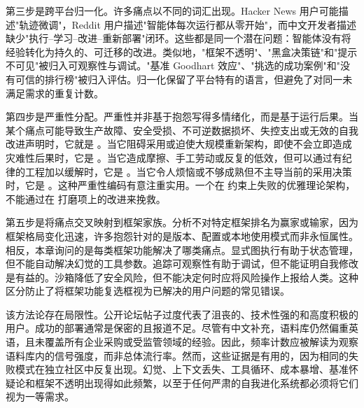 第三步是跨平台归一化。许多痛点以不同的词汇出现。Hacker News 用户可能描述"轨迹微调"，Reddit 用户描述"智能体每次运行都从零开始"，而中文开发者描述缺少"执行--学习--改进--重新部署"闭环。这些都是同一个潜在问题：智能体没有将经验转化为持久的、可迁移的改进。类似地，"框架不透明"、"黑盒决策链"和"提示不可见"被归入可观察性与调试。"基准 Goodhart 效应"、"挑选的成功案例"和"没有可信的排行榜"被归入评估。归一化保留了平台特有的语言，但避免了对同一未满足需求的重复计数。

第四步是严重性分配。严重性并非基于抱怨写得多情绪化，而是基于运行后果。当某个痛点可能导致生产故障、安全受损、不可逆数据损坏、失控支出或无效的自我改进声明时，它就是 \sevcritical{}。当它阻碍采用或迫使大规模重新架构，即使不会立即造成灾难性后果时，它是 \sevhigh{}。当它造成摩擦、手工劳动或反复的低效，但可以通过有纪律的工程加以缓解时，它是 \sevmedium{}。当它令人烦恼或不够成熟但不主导当前的采用决策时，它是 \sevlow{}。这种严重性编码有意注重实用。一个在 \sevcritical{} 约束上失败的优雅理论架构，不能通过在 \sevmedium{} 打磨项上的改进来挽救。

第五步是将痛点交叉映射到框架家族。分析不对特定框架排名为赢家或输家，因为框架格局变化迅速，许多抱怨针对的是版本、配置或本地使用模式而非永恒属性。相反，本章询问的是每类框架功能解决了哪类痛点。显式图执行有助于状态管理，但不能自动解决幻觉的工具参数。追踪可观察性有助于调试，但不能证明自我修改是有益的。沙箱降低了安全风险，但不能决定何时应将风险操作上报给人类。这种区分防止了将框架功能复选框视为已解决的用户问题的常见错误。

该方法论存在局限性。公开论坛帖子过度代表了沮丧的、技术性强的和高度积极的用户。成功的部署通常是保密的且报道不足。尽管有中文补充，语料库仍然偏重英语，且未覆盖所有企业采购或受监管领域的经验。因此，频率计数应被解读为观察语料库内的信号强度，而非总体流行率。然而，这些证据是有用的，因为相同的失败模式在独立社区中反复出现。幻觉、上下文丢失、工具循环、成本暴增、基准怀疑论和框架不透明出现得如此频繁，以至于任何严肃的自我进化系统都必须将它们视为一等需求。

